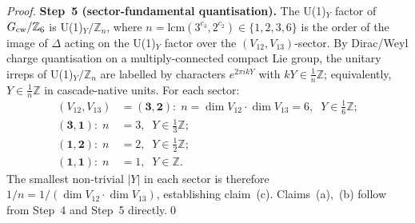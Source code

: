 \documentclass[12pt,a4paper]{article}
\begin{document}
\begin{proof}
\textbf{Step~5 (sector-fundamental quantisation).} The U(1)$_Y$ factor of $G_{\rm cw}/\mathbb{Z}_6$ is U(1)$_Y/\mathbb{Z}_n$, where $n=\mathrm{lcm}(3^{c_3},2^{c_2})\in\{1,2,3,6\}$ is the order of the image of $\Delta$ acting on the U(1)$_Y$ factor over the $(V_{12},V_{13})$-sector. By Dirac/Weyl charge quantisation on a multiply-connected compact Lie group, the unitary irreps of U(1)$_Y/\mathbb{Z}_n$ are labelled by characters $e^{2\pi i k Y}$ with $kY\in\frac{1}{n}\mathbb{Z}$; equivalently, $Y\in\frac{1}{n}\mathbb{Z}$ in cascade-native units. For each sector:
\begin{align*}
(V_{12},V_{13})&=(\mathbf{3},\mathbf{2}):\;n=\dim V_{12}\cdot\dim V_{13}=6,\;\;Y\in\tfrac{1}{6}\mathbb{Z};\\
(\mathbf{3},\mathbf{1}):\;n&=3,\;\;Y\in\tfrac{1}{3}\mathbb{Z};\\
(\mathbf{1},\mathbf{2}):\;n&=2,\;\;Y\in\tfrac{1}{2}\mathbb{Z};\\
(\mathbf{1},\mathbf{1}):\;n&=1,\;\;Y\in\mathbb{Z}.
\end{align*}
The smallest non-trivial $|Y|$ in each sector is therefore $1/n=1/(\dim V_{12}\cdot\dim V_{13})$, establishing claim~(c). Claims~(a),~(b) follow from Step~4 and Step~5 directly.\qed
\end{proof}
\end{document}
